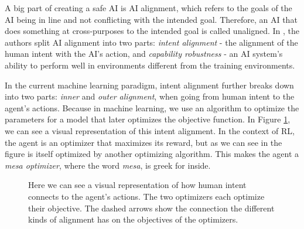 \documentclass[12pt,A4]{report}
\theoremstyle{definition}
\begin{document}


A big part of creating a safe AI is AI alignment, which refers to the goals of the AI being in line and not conflicting with the intended goal. Therefore, an AI that does something at cross-purposes to the intended goal is called unaligned. In \citet{Hubringer}, the authors split AI alignment into two parts: \textit{intent alignment} - the alignment of the human intent with the AI's action, and \textit{capability robustness} - an AI system's ability to perform well in environments different from the training environments. 

In the current machine learning paradigm, intent alignment further breaks down into two parts: \textit{inner} and \textit{outer alignment}, when going from human intent to the agent's actions. Because in machine learning, we use an algorithm to optimize the parameters for a model that later optimizes the objective function. In Figure \ref{fig:alignment}, we can see a visual representation of this intent alignment. In the context of RL, the agent is an optimizer that maximizes its reward, but as we can see in the figure is itself optimized by another optimizing algorithm. This makes the agent a \textit{mesa optimizer}, where the word \textit{mesa}, is greek for inside. 

\begin{figure}[H]
  
  \caption{Here we can see a visual representation of how human intent connects to the agent's actions. The two optimizers each optimize their objective. The dashed arrows show the connection the different kinds of alignment has on the objectives of the optimizers.}
  \label{fig:alignment}
\end{figure}


\end{document}
